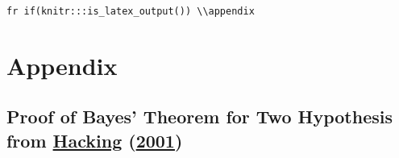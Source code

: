 \documentclass[12pt,twoside]{reedthesis}
\begin{document}
\texttt{fr\ if(knitr:::is\_latex\_output())\ \textquotesingle{}\textbackslash{}\textbackslash{}appendix\textquotesingle{}}

\hypertarget{appendix}{%
\chapter{Appendix}\label{appendix}}

\hypertarget{bayesproof}{%
\section{\texorpdfstring{Proof of Bayes' Theorem for Two Hypothesis from \protect\hyperlink{ref-hackingIntroductionProbabilityInductive2001}{Hacking} (\protect\hyperlink{ref-hackingIntroductionProbabilityInductive2001}{2001})}{Proof of Bayes' Theorem for Two Hypothesis from Hacking (2001)}}\label{bayesproof}}
\end{document}
